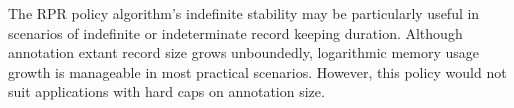 The RPR policy algorithm's indefinite stability may be particularly useful in scenarios of indefinite or indeterminate record keeping duration.
Although annotation extant record size grows unboundedly, logarithmic memory usage growth is manageable in most practical scenarios.
However, this policy would not suit applications with hard caps on annotation size. %


% 

% 

% 

